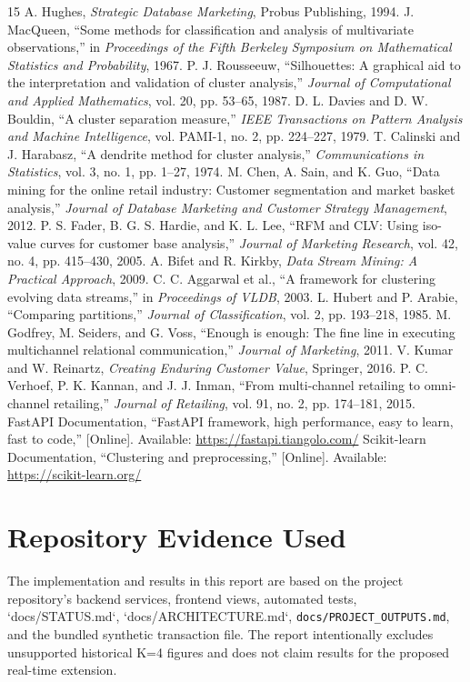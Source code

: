 \documentclass[12pt,a4paper]{report}
\begin{document}
\renewcommand{\bibname}{REFERENCES}
\begin{thebibliography}{15}
 A. Hughes, \emph{Strategic Database Marketing}, Probus Publishing, 1994.
 J. MacQueen, ``Some methods for classification and analysis of multivariate observations,'' in \emph{Proceedings of the Fifth Berkeley Symposium on Mathematical Statistics and Probability}, 1967.
 P. J. Rousseeuw, ``Silhouettes: A graphical aid to the interpretation and validation of cluster analysis,'' \emph{Journal of Computational and Applied Mathematics}, vol. 20, pp. 53--65, 1987.
 D. L. Davies and D. W. Bouldin, ``A cluster separation measure,'' \emph{IEEE Transactions on Pattern Analysis and Machine Intelligence}, vol. PAMI-1, no. 2, pp. 224--227, 1979.
 T. Calinski and J. Harabasz, ``A dendrite method for cluster analysis,'' \emph{Communications in Statistics}, vol. 3, no. 1, pp. 1--27, 1974.
 M. Chen, A. Sain, and K. Guo, ``Data mining for the online retail industry: Customer segmentation and market basket analysis,'' \emph{Journal of Database Marketing and Customer Strategy Management}, 2012.
 P. S. Fader, B. G. S. Hardie, and K. L. Lee, ``RFM and CLV: Using iso-value curves for customer base analysis,'' \emph{Journal of Marketing Research}, vol. 42, no. 4, pp. 415--430, 2005.
 A. Bifet and R. Kirkby, \emph{Data Stream Mining: A Practical Approach}, 2009.
 C. C. Aggarwal et al., ``A framework for clustering evolving data streams,'' in \emph{Proceedings of VLDB}, 2003.
 L. Hubert and P. Arabie, ``Comparing partitions,'' \emph{Journal of Classification}, vol. 2, pp. 193--218, 1985.
 M. Godfrey, M. Seiders, and G. Voss, ``Enough is enough: The fine line in executing multichannel relational communication,'' \emph{Journal of Marketing}, 2011.
 V. Kumar and W. Reinartz, \emph{Creating Enduring Customer Value}, Springer, 2016.
 P. C. Verhoef, P. K. Kannan, and J. J. Inman, ``From multi-channel retailing to omni-channel retailing,'' \emph{Journal of Retailing}, vol. 91, no. 2, pp. 174--181, 2015.
 FastAPI Documentation, ``FastAPI framework, high performance, easy to learn, fast to code,'' [Online]. Available: \url{https://fastapi.tiangolo.com/}
 Scikit-learn Documentation, ``Clustering and preprocessing,'' [Online]. Available: \url{https://scikit-learn.org/}
\end{thebibliography}

\chapter{Repository Evidence Used}
The implementation and results in this report are based on the project repository's backend services, frontend views, automated tests, `docs/STATUS.md`, `docs/ARCHITECTURE.md`, \texttt{docs/PROJECT\_OUTPUTS.md}, and the bundled synthetic transaction file. The report intentionally excludes unsupported historical K=4 figures and does not claim results for the proposed real-time extension.
\end{document}
